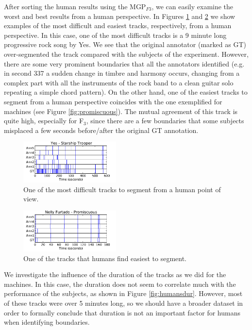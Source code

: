 \documentclass{article}
\begin{document}
After sorting the human results using the MGP$_{F3}$, we can easily examine the worst and best results from a human perspective.
In Figures \ref{fig:starship-human} and \ref{fig:promiscuous-human} we show examples of the most difficult and easiest tracks, respectively, from a human perspective.
In this case, one of the most difficult tracks is a 9 minute long progressive rock song by Yes.
We see that the original annotator (marked as GT) over-segmented the track compared with the subjects of the experiment.
However, there are some very prominent boundaries that all the annotators identified (e.g. in second 337 a sudden change in timbre and harmony occurs, changing from a complex part with all the instruments of the rock band to a clean guitar solo repeating a simple chord pattern).
On the other hand, one of the easiest tracks to segment from a human perspective coincides with the one exemplified for machines (see Figure \ref{fig:promiscuous}).
The mutual agreement of this track is quite high, especially for F$_3$, since there are a few boundaries that some subjects misplaced a few seconds before/after the original GT annotation.

\begin{figure}
  \centering
  \includegraphics[width=0.45\textwidth, height=0.13\textheight]{plots/StarshipTrooper-human.pdf}
  \caption{One of the most difficult tracks to segment from a human point of view.}
  \label{fig:starship-human}
\end{figure}%

\begin{figure}
  \centering
  \includegraphics[width=0.45\textwidth, height=0.13\textheight]{plots/Promiscuous-human.pdf}
  \caption{One of the tracks that humans find easiest to segment.}
  \label{fig:promiscuous-human}
\end{figure}%

We investigate the influence of the duration of the tracks as we did for the machines.
In this case, the duration does not seem to correlate much with the performance of the subjects, as shown in Figure \ref{fig:humansdur}.
However, most of these tracks were over 5 minutes long, so we should have a broader dataset in order to formally conclude that duration is not an important factor for humans when identifying boundaries.
\end{document}
